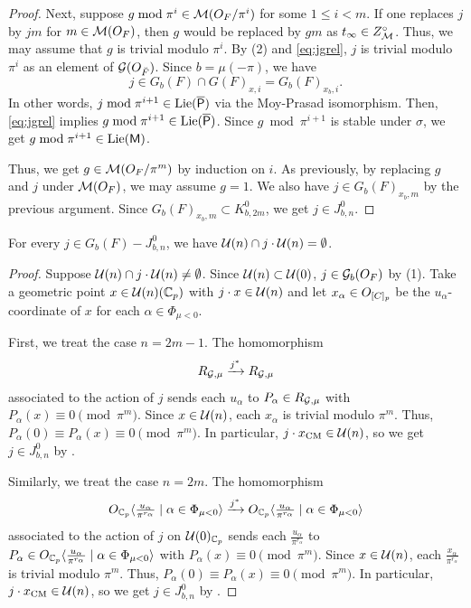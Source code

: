 \documentclass[12pt,reqno]{amsart}
\begin{document}
\begin{proof}
    Next, suppose $g \bmod \pi^i \in {\mathcal{M}}(O_F / \pi^i)$ for some $1 \leq i < m$. If one replaces $j$ by $jm$ for $m \in {\mathcal{M}}(O_F)$, then $g$ would be replaced by $gm$ as $t_\infty \in Z_{\mathcal{M}}^\circ$. Thus, we may assume that $g$ is trivial modulo $\pi^i$. By  (2) and \eqref{eq:jgrel}, $j$ is trivial modulo $\pi^i$ as an element of ${\mathcal{G}}(O_{\breve{F}})$. Since $b = \mu(-\pi)$, we have 
    \[
        j \in G_b(F) \cap G(F)_{x, i} = G_b(F)_{x_b, i}. 
    \]  
    In other words, $j \bmod \pi^{i+1} \in {\operatorname{Lie}}({\mathsf{{\overline{P}}}})$ via the Moy-Prasad isomorphism. Then, \eqref{eq:jgrel} implies $g \bmod \pi^{i+1} \in {\operatorname{Lie}}({\mathsf{{\overline{P}}}})$. Since $g \bmod \pi^{i+1}$ is stable under $\sigma$, we get $g \bmod \pi^{i+1} \in {\operatorname{Lie}}({\mathsf{M}})$. 

    Thus, we get $g \in {\mathcal{M}}(O_F / \pi^m)$ by induction on $i$. As previously, by replacing $g$ and $j$ under ${\mathcal{M}}(O_F)$, we may assume $g = 1$. We also have $j \in G_b(F)_{x_b, m}$ by the previous argument. Since $G_b(F)_{x_b, m} \subset K_{b, 2m}^0$, we get $j \in J_{b, n}^0$. 
\end{proof}

\begin{prop} \label{prop:action_outside_J_bn}
    For every $j \in G_b(F) - J_{b, n}^0$, we have ${\mathcal{U}}(n) \cap j \cdot {\mathcal{U}}(n) = \emptyset$. 
\end{prop}
\begin{proof}
    Suppose ${\mathcal{U}}(n) \cap j \cdot {\mathcal{U}}(n) \neq \emptyset$. Since ${\mathcal{U}}(n) \subset {\mathcal{U}}(0)$, $j \in {\mathcal{G}}_b(O_F)$ by  (1). Take a geometric point $x \in {\mathcal{U}}(n)(\mathbb{C}_p)$ with $j \cdot x \in {\mathcal{U}}(n)$ and let $x_\alpha \in O_{\mathbb{[}C]_p}$ be the $u_\alpha$-coordinate of $x$ for each $\alpha \in \Phi_{\mu < 0}$. 

    First, we treat the case $n = 2m - 1$. The homomorphism
    \[
        R_{{\mathcal{G}},\mu} \xrightarrow{j^*} R_{{\mathcal{G}},\mu}
    \]
    associated to the action of $j$ sends each $u_\alpha$ to $P_\alpha \in R_{{\mathcal{G}}, \mu}$ with $P_\alpha(x) \equiv 0 \pmod{\pi^m}$. Since $x \in {\mathcal{U}}(n)$, each $x_\alpha$ is trivial modulo $\pi^m$. Thus, $P_\alpha(0) \equiv P_\alpha(x) \equiv 0 \pmod{\pi^m}$. In particular, $j \cdot x_{\operatorname{CM}} \in {\mathcal{U}}(n)$, so we get $j \in J_{b, n}^0$ by . 

    Similarly, we treat the case $n = 2m$. The homomorphism 
    \[  
        O_{\mathbb{C}_p} \langle \tfrac{u_\alpha}{\pi^{r_\alpha}} \mid \alpha \in \Phi_{\mu < 0} \rangle \xrightarrow{j^*} O_{\mathbb{C}_p} \langle \tfrac{u_\alpha}{\pi^{r_\alpha}} \mid \alpha \in \Phi_{\mu < 0} \rangle
    \]  
    associated to the action of $j$ on ${\mathcal{U}}(0)_{\mathbb{C}_p}$ sends each $\tfrac{u_\alpha}{\pi^{r_\alpha}}$ to $P_\alpha \in O_{\mathbb{C}_p} \langle \tfrac{u_\alpha}{\pi^{r_\alpha}} \mid \alpha \in \Phi_{\mu < 0} \rangle$ with $P_\alpha(x) \equiv 0 \pmod{\pi^m}$. Since $x \in {\mathcal{U}}(n)$, each $\tfrac{x_\alpha}{\pi^{r_\alpha}}$ is trivial modulo $\pi^m$. Thus, $P_\alpha(0) \equiv P_\alpha(x) \equiv 0 \pmod{\pi^m}$. In particular, $j \cdot x_{\operatorname{CM}} \in {\mathcal{U}}(n)$, so we get $j \in J_{b, n}^0$ by .  
\end{proof}
\end{document}
